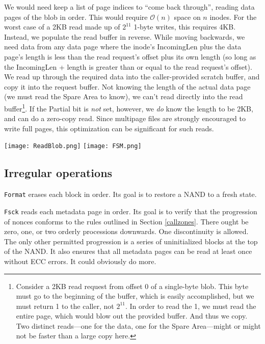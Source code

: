 \documentclass[letterpaper,10pt]{article}
\begin{document}
We would need keep a list of page indices to ``come back through'', reading
data pages of the blob in order. This would require $\mathcal{O}(n)$ space on $n$ inodes.
For the worst case of a 2KB read made up of $2^{11}$ 1-byte writes, this
requires 4KB. Instead, we populate the read buffer in reverse. While moving
backwards, we need data from any data page where the inode's IncomingLen plus
the data page's length is less than the read request's offset plus its own
length (so long as the IncomingLen + length is greater than or equal to the
read request's offset). We read up through the required data into the caller-provided
scratch buffer, and copy it into the request buffer. Not knowing the length
of the actual data page (we must read the Spare Area to know), we can't read
directly into the read buffer\footnote{Consider a 2KB read request
from offset 0 of a single-byte blob. This byte must go to the beginning of the buffer,
which is easily accomplished, but we must return 1 to the caller, not $2^{11}$.
In order to read the 1, we must read the entire page, which would blow out the
provided buffer. And thus we copy. Two distinct reads---one for the data, one for
the Spare Area---might or might not be faster than a large copy here.}.
If the Partial bit is \textit{not} set, however, we \textit{do} know the length
to be 2KB, and can do a zero-copy read. Since multipage files are strongly
encouraged to write full pages, this optimization can be significant for such
reads.

\begin{minipage}{\textwidth}
\begin{center}
\texttt{[image: ReadBlob.png]}
\texttt{[image: FSM.png]}
\end{center}
\end{minipage}

\subsection{Irregular operations}
\texttt{Format} erases each block in order. Its goal is to restore a NAND to
a fresh state.

\texttt{Fsck} reads each metadata page in order. Its goal is to verify that the
progression of nonces conforms to the rules outlined in Section \ref{callzones}.
There ought be zero, one, or two orderly processions downwards. One discontinuity
is allowed. The only other permitted progression is a series of uninitialized blocks
at the top of the NAND. It also ensures that all metadata pages can be read at
least once without ECC errors. It could obviously do more.
\end{document}
